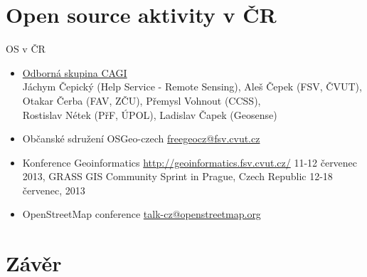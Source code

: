 \documentclass{beamer}
\begin{document}
\section{Open source aktivity v ČR}
\begin{frame}{OS v ČR}
    \begin{itemize}
        \item \href{http://www.cagi.cz/os25-open-source-a-open-data}{Odborná skupina CAGI} \\
            Jáchym Čepický (Help Service - Remote Sensing), Aleš Čepek (FSV, ČVUT),\\
            Otakar Čerba (FAV, ZČU), Přemysl Vohnout (CCSS),\\
            Rostislav Nétek (PřF, ÚPOL), Ladislav Čapek (Geosense)
        \pause

        \item Občanské sdružení OSGeo-czech \href{mailto:freegeocz@fsv.cvut.cz}{freegeocz@fsv.cvut.cz}
            \pause
        \item Konference Geoinformatics \url{http://geoinformatics.fsv.cvut.cz/}
            11-12 červenec 2013, GRASS GIS Community Sprint in Prague, Czech
            Republic 12-18 červenec, 2013
            \pause
        \item OpenStreetMap conference \href{mailto:talk-cz@openstreetmap.org}{talk-cz@openstreetmap.org}
    \end{itemize}
\end{frame}



\section*{Závěr}
\end{document}
